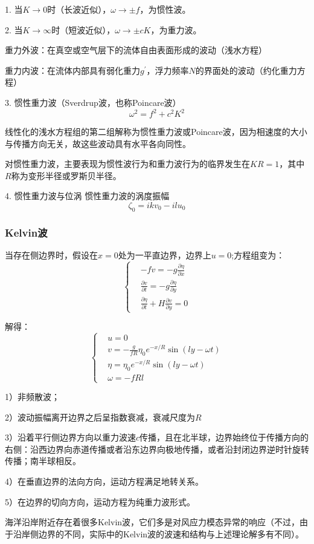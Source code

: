 \documentclass{article}
\begin{document}
1. 当$K \rightarrow 0$时（长波近似），$\omega\rightarrow\pm f$，为惯性波。

2. 当$K \rightarrow \infty$时（短波近似），$\omega\rightarrow\pm cK$，为重力波。

重力外波：在真空或空气层下的流体自由表面形成的波动（浅水方程）

重力内波：在流体内部具有弱化重力$g^{\prime}$，浮力频率$N$的界面处的波动（约化重力方程）

3. 惯性重力波（Sverdrup波，也称Poincare波）
$$\omega^2 = f^2+c^2K^2$$

线性化的浅水方程组的第二组解称为惯性重力波或Poincare波，因为相速度的大小与传播方向无关，故这些波动具有水平各向同性。

对惯性重力波，主要表现为惯性波行为和重力波行为的临界发生在$KR=1$，其中$R$称为变形半径或罗斯贝半径。

4. 惯性重力波与位涡
惯性重力波的涡度振幅
$$\zeta_0=ikv_0-ilu_0$$

\subsubsection{Kelvin波}
当存在侧边界时，假设在$x=0$处为一平直边界，边界上$u=0$;方程组变为：
$$\begin{cases}
    &-fv=-g\frac{\partial \eta}{\partial x}\\
    &\frac{\partial v}{\partial t}=-g\frac{\partial \eta}{\partial y}\\
    &\frac{\partial \eta}{\partial t}+H\frac{\partial v}{\partial y} = 0
\end{cases}$$

解得：
$$\begin{cases}
    &u=0\\
    &v=-\frac{g}{fR}\eta_0e^{-x/R}\sin(ly-\omega t)\\
    &\eta = \eta_0e^{-x/R}\sin(ly-\omega t)\\
    &\omega = -fRl
\end{cases}$$

1）非频散波；

2）波动振幅离开边界之后呈指数衰减，衰减尺度为$R$

3）沿着平行侧边界方向以重力波速$c$传播，且在北半球，边界始终位于传播方向的右侧：沿西边界向赤道传播或者沿东边界向极地传播，或者沿封闭边界逆时针旋转传播；南半球相反。

4）在垂直边界的法向方向，运动方程满足地转关系。

5）在边界的切向方向，运动方程为纯重力波形式。

海洋沿岸附近存在着很多Kelvin波，它们多是对风应力模态异常的响应（不过，由于沿岸侧边界的不同，实际中的Kelvin波的波速和结构与上述理论解多有不同）。
\end{document}
